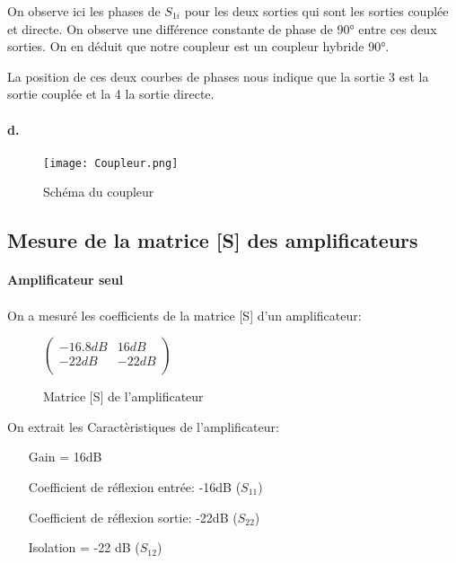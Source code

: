 \documentclass[oneside,a4paper,12pt]{article}
\begin{document}
	On observe ici les phases de $S_{1i}$ pour les deux sorties qui sont les sorties couplée et directe.
	On observe une différence constante de phase de 90° entre ces deux sorties. On en déduit que notre coupleur est un coupleur hybride 90°. 

	La position de ces deux courbes de phases nous indique que la sortie 3 est la sortie couplée et la 4 la sortie directe.

	\paragraph{d.}
	\paragraph{}
	\begin{figure}[h]
		\centering
		\texttt{[image: Coupleur.png]}
		\caption{Schéma du coupleur}		
	\end{figure}

	\subsection{Mesure de la matrice [S] des amplificateurs}
	\paragraph{Amplificateur seul} \paragraph{}
	On a mesuré les coefficients de la matrice [S] d'un amplificateur:
	\begin{figure}[h]
		\centering
		$
		\begin{pmatrix}
			-16.8 dB & 16 dB \\
			-22 dB & -22 dB \\
		\end{pmatrix}
		$
		\caption{Matrice [S] de l'amplificateur}
	\end{figure}

	On extrait les Caractèristiques de l'amplificateur:
	\begin{itemize}
		\item[Gain] = 16dB
		\item[Coefficient de réflexion] entrée: -16dB ($S_{11}$)
		\item[Coefficient de réflexion] sortie: -22dB ($S_{22}$)
		\item[Isolation] = -22 dB ($S_{12}$)  
	\end{itemize}
\end{document}
